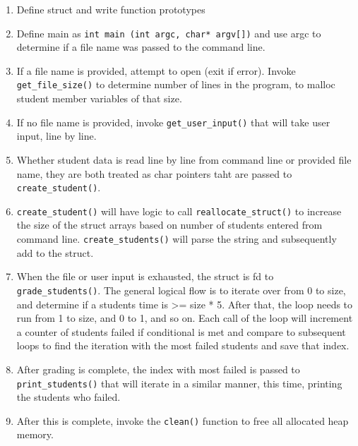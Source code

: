 \begin{enumerate}
\def\labelenumi{\arabic{enumi}.}
\tightlist
\item
  Define struct and write function prototypes
\item
  Define main as \texttt{int\ main\ (int\ argc,\ char*\ argv{[}{]})} and
  use argc to determine if a file name was passed to the command line.
\item
  If a file name is provided, attempt to open (exit if error). Invoke
  \texttt{get\_file\_size()} to determine number of lines in the
  program, to malloc student member variables of that size.
\item
  If no file name is provided, invoke \texttt{get\_user\_input()} that
  will take user input, line by line.
\item
  Whether student data is read line by line from command line or
  provided file name, they are both treated as char pointers taht are
  passed to \texttt{create\_student()}.
\item
  \texttt{create\_student()} will have logic to call
  \texttt{reallocate\_struct()} to increase the size of the struct
  arrays based on number of students entered from command line.
  \texttt{create\_students()} will parse the string and subsequently add
  to the struct.
\item
  When the file or user input is exhausted, the struct is fd to
  \texttt{grade\_students()}. The general logical flow is to iterate
  over from 0 to size, and determine if a students time is \textgreater=
  size * 5. After that, the loop needs to run from 1 to size, and 0 to
  1, and so on. Each call of the loop will increment a counter of
  students failed if conditional is met and compare to subsequent loops
  to find the iteration with the most failed students and save that
  index.
\item
  After grading is complete, the index with most failed is passed to
  \texttt{print\_students()} that will iterate in a similar manner, this
  time, printing the students who failed.
\item
  After this is complete, invoke the \texttt{clean()} function to free
  all allocated heap memory.
\end{enumerate}
